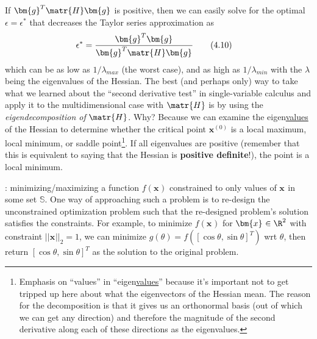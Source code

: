 \documentclass[11pt]{article}
\renewcommand\vec[2][]{\bm{#2}_{#1}}
\newcommand\myspace[1][]{\vspace{#1\bigskipamount}}
\newcommand\p{\Needspace{10\baselineskip} \noindent}
\newcommand\tlab[1]{\tag{#1}\label{#1}}
\begin{document}
If $\vec{g}^T \matr{H} \vec{g}$ is positive, then we can easily solve for the optimal $\epsilon = \epsilon^*$ that decreases the Taylor series approximation as
\begin{align}
\epsilon^* &= \frac{\vec{g}^T\vec{g} }{\vec{g}^T \matr{H} \vec{g} } \tlab{4.10}
\end{align}
which can be as low as $1/\lambda_{max}$ (the worst case), and as high as $1/\lambda_{min}$ with the $\lambda$ being the eigenvalues of the Hessian. The best (and perhaps only) way to take what we learned about the ``second derivative test'' in single-variable calculus and apply it to the multidimensional case with $\matr{H}$ is by using the \textit{eigendecomposition of} $\matr{H}$. Why? Because we can examine the eigen\underline{values} of the Hessian to determine whether the critical point $\vec{x}^{(0)}$ is a local maximum, local minimum, or saddle point\footnote{Emphasis on ``values'' in ``eigen\underline{values}'' because it's important not to get tripped up here about what the eigenvectors of the Hessian mean. The reason for the decomposition is that it gives us an orthonormal basis (out of which we can get any direction) and therefore the magnitude of the second derivative along each of these directions as the eigenvalues.}. If all eigenvalues are positive (remember that this is equivalent to saying that the Hessian is \textbf{positive definite}!), the point is a local minimum.

\myspace
\p {}: minimizing/maximizing a function $f(\vec x)$ constrained to only values of $\vec x$ in some set $\mathbb{S}$. One way of approaching such a problem is to re-design the unconstrained optimization problem such that the re-designed problem's solution satisfies the constraints. For example, to minimize $f(\vec x)$ for $\vec x \in \R^2$ with constraint $||\vec x||_2 = 1$, we can minimize $g(\theta) = f([\cos\theta, \sin\theta]^T)$ wrt $\theta$, then return $[\cos\theta, \sin\theta]^T$ as the solution to the original problem.  \\
\end{document}
